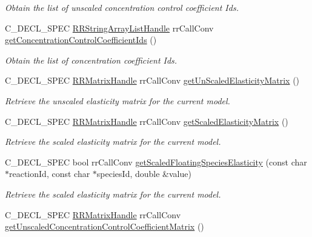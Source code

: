 \begin{DoxyCompactItemize}
\begin{DoxyCompactList}\small\item\em \-Obtain the list of unscaled concentration control coefficient \-Ids. \end{DoxyCompactList}\item 
\-C\-\_\-\-D\-E\-C\-L\-\_\-\-S\-P\-E\-C \*
\hyperlink{rr__c__types_8h_ab1bd3d726b37b2b2be69f0144e5a3e18}{\-R\-R\-String\-Array\-List\-Handle} \*
rr\-Call\-Conv \hyperlink{group__utility_ga56104adc5e98350c59d6ecf11b859b58}{get\-Concentration\-Control\-Coefficient\-Ids} ()
\begin{DoxyCompactList}\small\item\em \-Obtain the list of concentration coefficient \-Ids. \end{DoxyCompactList}\item 
\-C\-\_\-\-D\-E\-C\-L\-\_\-\-S\-P\-E\-C \hyperlink{rr__c__types_8h_a87174eefa58ae98dec58c9253ae6c5da}{\-R\-R\-Matrix\-Handle} \*
rr\-Call\-Conv \hyperlink{group__utility_ga82cf39ff64eb0446c9f5a2e772283323}{get\-Un\-Scaled\-Elasticity\-Matrix} ()
\begin{DoxyCompactList}\small\item\em \-Retrieve the unscaled elasticity matrix for the current model. \end{DoxyCompactList}\item 
\-C\-\_\-\-D\-E\-C\-L\-\_\-\-S\-P\-E\-C \hyperlink{rr__c__types_8h_a87174eefa58ae98dec58c9253ae6c5da}{\-R\-R\-Matrix\-Handle} \*
rr\-Call\-Conv \hyperlink{group__utility_gaf8431784ec5c2ce1d0416606056f3d44}{get\-Scaled\-Elasticity\-Matrix} ()
\begin{DoxyCompactList}\small\item\em \-Retrieve the scaled elasticity matrix for the current model. \end{DoxyCompactList}\item 
\-C\-\_\-\-D\-E\-C\-L\-\_\-\-S\-P\-E\-C bool rr\-Call\-Conv \hyperlink{group__utility_ga3510a64d86e24d36df049fce06f3a138}{get\-Scaled\-Floating\-Species\-Elasticity} (const char $\ast$reaction\-Id, const char $\ast$species\-Id, double \&value)
\begin{DoxyCompactList}\small\item\em \-Retrieve the scaled elasticity matrix for the current model. \end{DoxyCompactList}\item 
\-C\-\_\-\-D\-E\-C\-L\-\_\-\-S\-P\-E\-C \hyperlink{rr__c__types_8h_a87174eefa58ae98dec58c9253ae6c5da}{\-R\-R\-Matrix\-Handle} \*
rr\-Call\-Conv \hyperlink{group__utility_ga418c0108d37bc4f35a55291ca85e0a3f}{get\-Unscaled\-Concentration\-Control\-Coefficient\-Matrix} ()

\end{DoxyCompactItemize}
